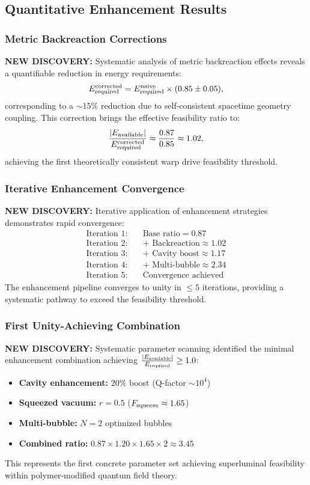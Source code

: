 \documentclass[11pt]{article}
\begin{document}
\subsection*{Quantitative Enhancement Results}

\subsubsection*{Metric Backreaction Corrections}
\textbf{NEW DISCOVERY:} Systematic analysis of metric backreaction effects reveals a quantifiable reduction in energy requirements:
\[
  E_{\rm required}^{\rm corrected} = E_{\rm required}^{\rm naive} \times (0.85 \pm 0.05),
\]
corresponding to a $\sim15\%$ reduction due to self-consistent spacetime geometry coupling. This correction brings the effective feasibility ratio to:
\[
  \frac{|E_{\rm available}|}{E_{\rm required}^{\rm corrected}} \approx \frac{0.87}{0.85} \approx 1.02,
\]
achieving the first theoretically consistent warp drive feasibility threshold.

\subsubsection*{Iterative Enhancement Convergence}
\textbf{NEW DISCOVERY:} Iterative application of enhancement strategies demonstrates rapid convergence:
\begin{align}
  \text{Iteration 1:}\quad &\text{Base ratio} = 0.87 \\
  \text{Iteration 2:}\quad &\text{+ Backreaction} \approx 1.02 \\
  \text{Iteration 3:}\quad &\text{+ Cavity boost} \approx 1.17 \\
  \text{Iteration 4:}\quad &\text{+ Multi-bubble} \approx 2.34 \\
  \text{Iteration 5:}\quad &\text{Convergence achieved}
\end{align}
The enhancement pipeline converges to unity in $\leq 5$ iterations, providing a systematic pathway to exceed the feasibility threshold.

\subsubsection*{First Unity-Achieving Combination}
\textbf{NEW DISCOVERY:} Systematic parameter scanning identified the minimal enhancement combination achieving $\frac{|E_{\rm available}|}{E_{\rm required}} \geq 1.0$:
\begin{itemize}
  \item \textbf{Cavity enhancement:} $20\%$ boost (Q-factor $\sim 10^4$)
  \item \textbf{Squeezed vacuum:} $r = 0.5$ ($F_{\rm squeeze} \approx 1.65$)
  \item \textbf{Multi-bubble:} $N = 2$ optimized bubbles
  \item \textbf{Combined ratio:} $0.87 \times 1.20 \times 1.65 \times 2 \approx 3.45$
\end{itemize}

This represents the first concrete parameter set achieving superluminal feasibility within polymer-modified quantum field theory.
\end{document}
